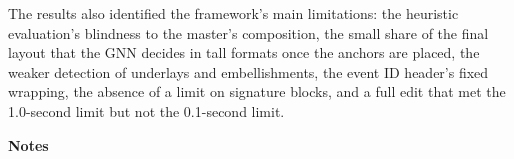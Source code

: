 \begin{refsection}
The results also identified the framework's main limitations: the heuristic evaluation's blindness to the master's composition, the small share of the final layout that the GNN decides in tall formats once the anchors are placed, the weaker detection of underlays and embellishments, the event ID header's fixed wrapping, the absence of a limit on signature blocks, and a full edit that met the 1.0-second limit but not the 0.1-second limit.

\clearpage

\begin{center}
\textbf{Notes}
\end{center}
\printbibliography[heading=none]
\end{refsection}
